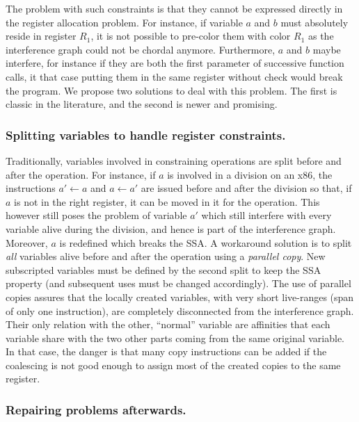 {The problem with such constraints is that they cannot be expressed directly in 
the register allocation problem. For instance, if variable $a$ and $b$ must 
absolutely reside in register $R_1$, it is not possible to pre-color them with 
color $R_1$ as the interference graph could not be chordal anymore.  
Furthermore, $a$ and $b$ maybe interfere, for instance if they are both the 
first parameter of successive function calls, it that case putting them in the 
same register without check would break the program. We propose two solutions 
to deal with this problem. The first is classic in the literature, and the 
second is newer and promising.


\subsubsection{Splitting variables to handle register constraints.}

Traditionally, variables involved in constraining operations are split before 
and after the operation. For instance, if $a$ is involved in a division on an 
x86, the instructions $a'\gets a$ and $a\gets a'$ are issued before and after 
the division so that, if $a$ is not in the right register, it can be moved in 
it for the operation. This however still poses the problem of variable $a'$ 
which still interfere with every variable alive during the division, and hence 
is part of the interference graph. Moreover, $a$ is redefined which breaks the 
SSA. A workaround solution is to split \emph{all} variables alive before and 
after the operation using a \emph{parallel copy}. New subscripted variables 
must be defined by the second split to keep the SSA property (and subsequent 
uses must be changed accordingly). The use of parallel copies assures that 
the locally created variables, with very short live-ranges (span of only one 
instruction), are completely disconnected from the interference graph. Their 
only relation with the other, ``normal'' variable are affinities that each 
variable share with the two other parts coming from the same original variable.
In that case, the danger is that many copy instructions can be added if the 
coalescing is not good enough to assign most of the created copies to the same 
register.


\subsubsection{Repairing problems afterwards.}

}
